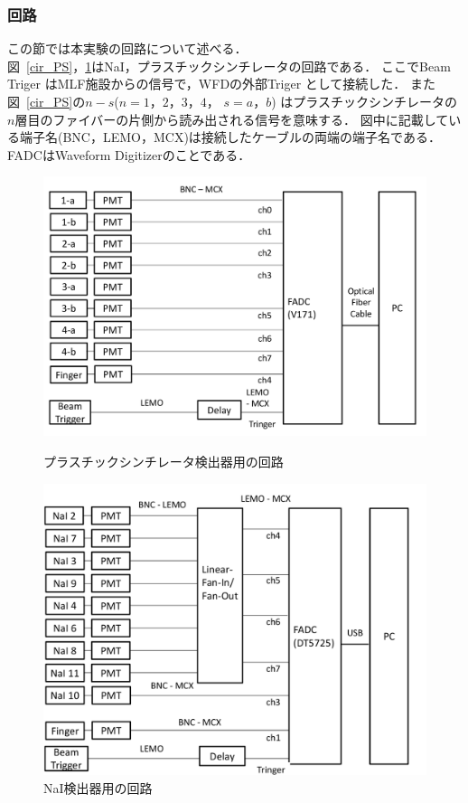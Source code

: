 \subsubsection{回路}
この節では本実験の回路について述べる．\\
図~\ref{cir_PS}，\ref{cir_nai}はNaI，プラスチックシンチレータの回路である．
ここでBeam Triger はMLF施設からの信号で，WFDの外部Triger として接続した．
また図~\ref{cir_PS}の$n-s$($n=1，2，3，4$， $s=a，b$) はプラスチックシンチレータの$n$層目のファイバーの片側から読み出される信号を意味する．
図中に記載している端子名(BNC，LEMO，MCX)は接続したケーブルの両端の端子名である．FADCはWaveform Digitizerのことである．
\begin{figure}[H]
  \begin{minipage}{0.45\hsize}
    \begin{center}
      \includegraphics[width=1\textwidth]{figure/tajima/circuit_ps_2.png}
      \caption{プラスチックシンチレータ検出器用の回路}
      \label{cir_PS}
    \end{center}
  \end{minipage}
  \hfill
  \begin{minipage}{0.45\hsize}
    \begin{center}
      \includegraphics[width=1\textwidth]{figure/tajima/circuit_nai.png}
      \caption{NaI検出器用の回路}
      \label{cir_nai}
    \end{center}
  \end{minipage}
\end{figure}
